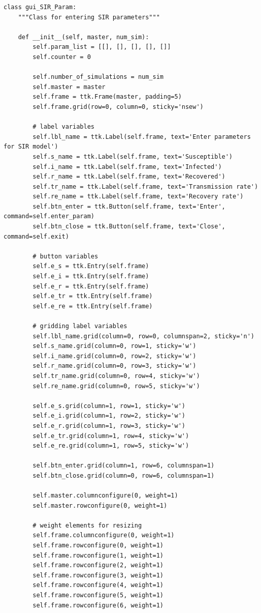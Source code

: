 \documentclass[11pt, a4paper]{article}
\begin{document}
\begin{lstlisting}
class gui_SIR_Param:
    """Class for entering SIR parameters"""

    def __init__(self, master, num_sim):
        self.param_list = [[], [], [], [], []]
        self.counter = 0

        self.number_of_simulations = num_sim
        self.master = master
        self.frame = ttk.Frame(master, padding=5)
        self.frame.grid(row=0, column=0, sticky='nsew')

        # label variables
        self.lbl_name = ttk.Label(self.frame, text='Enter parameters for SIR model')
        self.s_name = ttk.Label(self.frame, text='Susceptible')
        self.i_name = ttk.Label(self.frame, text='Infected')
        self.r_name = ttk.Label(self.frame, text='Recovered')
        self.tr_name = ttk.Label(self.frame, text='Transmission rate')
        self.re_name = ttk.Label(self.frame, text='Recovery rate')
        self.btn_enter = ttk.Button(self.frame, text='Enter', command=self.enter_param)
        self.btn_close = ttk.Button(self.frame, text='Close', command=self.exit)

        # button variables
        self.e_s = ttk.Entry(self.frame)
        self.e_i = ttk.Entry(self.frame)
        self.e_r = ttk.Entry(self.frame)
        self.e_tr = ttk.Entry(self.frame)
        self.e_re = ttk.Entry(self.frame)

        # gridding label variables
        self.lbl_name.grid(column=0, row=0, columnspan=2, sticky='n')
        self.s_name.grid(column=0, row=1, sticky='w')
        self.i_name.grid(column=0, row=2, sticky='w')
        self.r_name.grid(column=0, row=3, sticky='w')
        self.tr_name.grid(column=0, row=4, sticky='w')
        self.re_name.grid(column=0, row=5, sticky='w')

        self.e_s.grid(column=1, row=1, sticky='w')
        self.e_i.grid(column=1, row=2, sticky='w')
        self.e_r.grid(column=1, row=3, sticky='w')
        self.e_tr.grid(column=1, row=4, sticky='w')
        self.e_re.grid(column=1, row=5, sticky='w')

        self.btn_enter.grid(column=1, row=6, columnspan=1)
        self.btn_close.grid(column=0, row=6, columnspan=1)

        self.master.columnconfigure(0, weight=1)
        self.master.rowconfigure(0, weight=1)

        # weight elements for resizing
        self.frame.columnconfigure(0, weight=1)
        self.frame.rowconfigure(0, weight=1)
        self.frame.rowconfigure(1, weight=1)
        self.frame.rowconfigure(2, weight=1)
        self.frame.rowconfigure(3, weight=1)
        self.frame.rowconfigure(4, weight=1)
        self.frame.rowconfigure(5, weight=1)
        self.frame.rowconfigure(6, weight=1)


\end{lstlisting}
\end{document}
